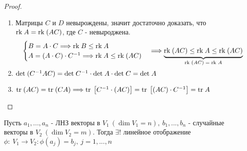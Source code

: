     \begin{proof} \tab 
        \begin{enumerate}
            \item Матрицы $C$ и $D$ невырождены, значит достаточно доказать, что \\
            $\text{rk}\hspace{0.09cm} A=\text{rk}\hspace{0.09cm} (AC)$, где $C$ - невыроджена.
            $$\begin{cases}
                B = A \cdot C \Longrightarrow \text{rk} \hspace{0.09cm} B \leq \text{rk} \hspace{0.09cm} A\\
                A = (A \cdot C) \cdot C^{-1} \Longrightarrow \text{rk} \hspace{0.09cm} A \leq \text{rk} \hspace{0.09cm} (AC)
            \end{cases} \Longrightarrow \undermat{\text{rk} \hspace{0.09cm} (AC) = \text{rk} \hspace{0.09cm} A}{\text{rk} \hspace{0.09cm} (AC)\leq \text{rk} \hspace{0.09cm} A \leq \text{rk} \hspace{0.09cm} (AC)}$$
            \item $\text{det}\hspace{0.09cm} (C^{-1}AC)=\text{det}\hspace{0.09cm} C^{-1}\cdot \text{det}\hspace{0.09cm} A\cdot \text{det}\hspace{0.09cm} C=\text{det}\hspace{0.09cm} A$
            \item $\text{tr} \hspace{0.09cm} (AC) = \text{tr} \hspace{0.09cm}(CA) \Longrightarrow \text{tr} \hspace{0.09cm}\left[C^{-1} \cdot (AC)\right] = \text{tr} \hspace{0.09cm}\left[(AC)\cdot C^{-1}\right] = \text{tr} \hspace{0.09cm}A$    
        \end{enumerate}
    \end{proof}  
    \begin{theorem}
        Пусть $a_1,...,a_n$ - ЛНЗ векторы в $V_1 \ (\dim V_1 = n), \ b_1,...,b_n$ - случайные векторы в $V_2\ (\dim V_2 = m)$. Тогда $\exists !$ линейное отображение $\phi: \ V_1 \to V_2: \phi(a_j) = b_j, \ j = 1,...,n$     
    \end{theorem}

